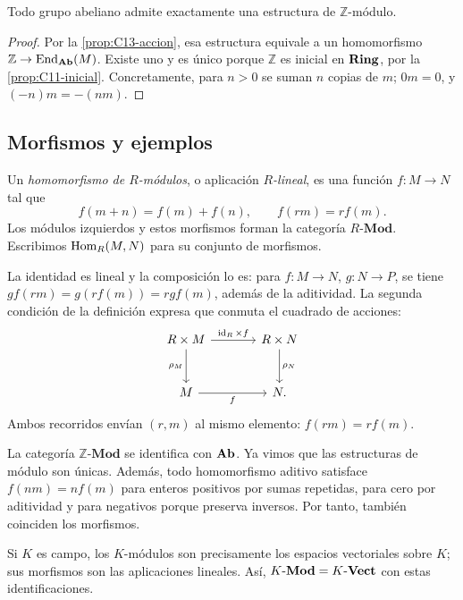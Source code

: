 \begin{prop}\label{prop:C13-Zmod}
Todo grupo abeliano admite exactamente una estructura de $\mathbb Z$-módulo.
\end{prop}
\begin{proof}
Por la \cref{prop:C13-accion}, esa estructura equivale a un homomorfismo $\mathbb Z\to\operatorname{End}_{\mathbf{Ab}}(M)$. Existe uno y es único porque $\mathbb Z$ es inicial en $\mathbf{Ring}$, por la \cref{prop:C11-inicial}. Concretamente, para $n>0$ se suman $n$ copias de $m$; $0m=0$, y $(-n)m=-(nm)$.
\end{proof}

\subsection{Morfismos y ejemplos}\label{tema:13-2-2}
\begin{defi}
Un \emph{homomorfismo de $R$-módulos}, o aplicación \emph{$R$-lineal}, es una función $f:M\to N$ tal que
\[
f(m+n)=f(m)+f(n),\qquad f(rm)=rf(m).
\]
Los módulos izquierdos y estos morfismos forman la categoría $R\text{-}\mathbf{Mod}$. Escribimos $\operatorname{Hom}_R(M,N)$ para su conjunto de morfismos.
\end{defi}
La identidad es lineal y la composición lo es: para $f:M\to N$, $g:N\to P$, se tiene $gf(rm)=g(rf(m))=rgf(m)$, además de la aditividad. La segunda condición de la definición expresa que conmuta el cuadrado de acciones:
\[
\begin{tikzcd}[column sep=large,row sep=large]
R\times M\arrow[r,"\id_R\times f"]\arrow[d,"\rho_M"']
&R\times N\arrow[d,"\rho_N"]\\
M\arrow[r,"f"']&N.
\end{tikzcd}
\]
Ambos recorridos envían $(r,m)$ al mismo elemento: $f(rm)=rf(m)$.

\begin{ejem}
La categoría $\mathbb Z\text{-}\mathbf{Mod}$ se identifica con $\mathbf{Ab}$. Ya vimos que las estructuras de módulo son únicas. Además, todo homomorfismo aditivo satisface $f(nm)=nf(m)$ para enteros positivos por sumas repetidas, para cero por aditividad y para negativos porque preserva inversos. Por tanto, también coinciden los morfismos.

Si $K$ es campo, los $K$-módulos son precisamente los espacios vectoriales sobre $K$; sus morfismos son las aplicaciones lineales. Así, $K\text{-}\mathbf{Mod}=K\text{-}\mathbf{Vect}$ con estas identificaciones.
\end{ejem}

